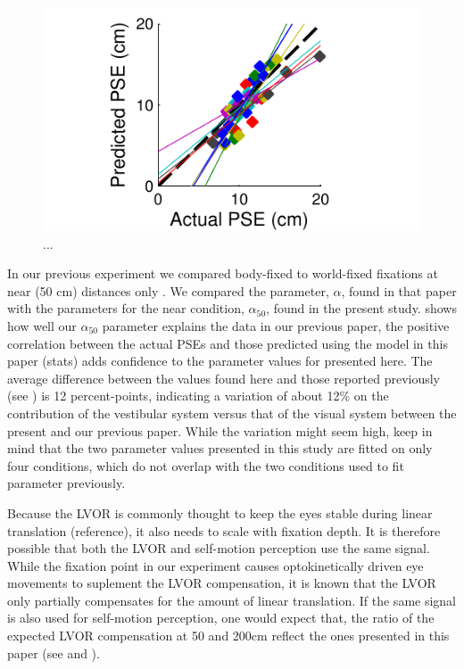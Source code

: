 \begin{figure}
    \includegraphics[width=1.0\textwidth]{src/paper4/p4_figure6.pdf}

    \caption{...}
    \label{p4:fig6}
\end{figure}

In our previous experiment we compared body-fixed to world-fixed fixations at near (50 \si{\centi\metre}) distances only \cite{clemens2015a}. We compared the parameter, $\alpha$, found in that paper with the parameters for the near condition, $\alpha_{50}$, found in the present study.  shows how well our $\alpha_{50}$ parameter explains the data in our previous paper, the positive correlation between the actual PSEs and those predicted using the model in this paper (stats) adds confidence to the parameter values for  presented here. The average difference between the values found here and those reported previously (see ) is 12  percent-points, indicating a variation of about 12\% on the contribution of the vestibular system versus that of the visual system between the present and our previous paper. While the variation might seem high, keep in mind that the two parameter values presented in this study are fitted on only four conditions, which do not overlap with the two conditions used to fit  parameter  previously.

Because the LVOR is commonly thought to keep the eyes stable during linear translation (reference), it also needs to scale with fixation depth. It is therefore possible that both the LVOR and self-motion perception use the same signal. While the fixation point in our experiment causes optokinetically driven eye movements to suplement the LVOR compensation, it is known that the LVOR only partially compensates for the amount of linear translation. If the same signal is also used for self-motion perception, one would expect that, the ratio of the expected LVOR compensation at 50 and 200cm reflect the ones presented in this paper (see  and ).

